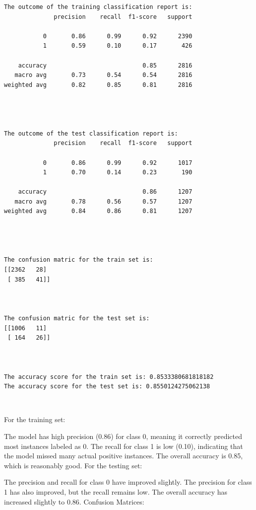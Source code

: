 \documentclass[11pt]{article}
\begin{document}
    \begin{Verbatim}[commandchars=\\\{\}]
The outcome of the training classification report is:
              precision    recall  f1-score   support

           0       0.86      0.99      0.92      2390
           1       0.59      0.10      0.17       426

    accuracy                           0.85      2816
   macro avg       0.73      0.54      0.54      2816
weighted avg       0.82      0.85      0.81      2816




The outcome of the test classification report is:
              precision    recall  f1-score   support

           0       0.86      0.99      0.92      1017
           1       0.70      0.14      0.23       190

    accuracy                           0.86      1207
   macro avg       0.78      0.56      0.57      1207
weighted avg       0.84      0.86      0.81      1207




The confusion matric for the train set is:
[[2362   28]
 [ 385   41]]



The confusion matric for the test set is:
[[1006   11]
 [ 164   26]]



The accuracy score for the train set is: 0.8533380681818182
The accuracy score for the test set is: 0.8550124275062138
    \end{Verbatim}

    \begin{center}
    \end{center}
    { \hspace*{\fill} \\}
    
    For the training set:

The model has high precision (0.86) for class 0, meaning it correctly
predicted most instances labeled as 0. The recall for class 1 is low
(0.10), indicating that the model missed many actual positive instances.
The overall accuracy is 0.85, which is reasonably good. For the testing
set:

The precision and recall for class 0 have improved slightly. The
precision for class 1 has also improved, but the recall remains low. The
overall accuracy has increased slightly to 0.86. Confusion Matrices:
\end{document}

